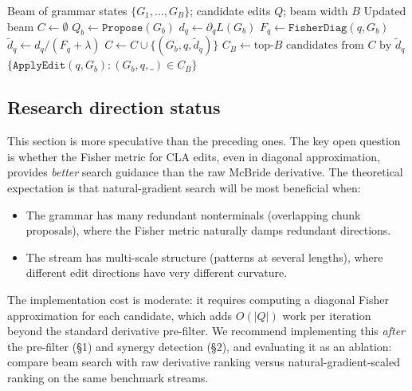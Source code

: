 \documentclass[11pt]{article}
\begin{document}
\begin{algorithm}
\caption{Geometry-aware beam search (speculative)}
\label{alg:natgrad}
\begin{algorithmic}[1]
\Require Beam of grammar states $\{G_1, \ldots, G_B\}$; candidate edits $Q$; beam width $B$
\Ensure Updated beam
\State $C \gets \emptyset$ 
  \State $Q_b \gets \texttt{Propose}(G_b)$ 
    \State $d_q \gets \partial_q L(G_b)$ 
    \State $F_q \gets \texttt{FisherDiag}(q, G_b)$ 
    \State $\tilde{d}_q \gets d_q / (F_q + \lambda)$ 
    \State $C \gets C \cup \{(G_b, q, \tilde{d}_q)\}$
  \EndFor
\EndFor
\State $C_B \gets \text{top-}B \text{ candidates from } C \text{ by } \tilde{d}_q$
\State \Return $\{\texttt{ApplyEdit}(q, G_b) : (G_b, q, \_) \in C_B\}$
\end{algorithmic}
\end{algorithm}

\subsection{Research direction status}

This section is more speculative than the preceding ones.  The key open question is whether the Fisher metric for CLA edits, even in diagonal approximation, provides \emph{better} search guidance than the raw McBride derivative.  The theoretical expectation is that natural-gradient search will be most beneficial when:
\begin{itemize}
  \item The grammar has many redundant nonterminals (overlapping chunk proposals), where the Fisher metric naturally damps redundant directions.
  \item The stream has multi-scale structure (patterns at several lengths), where different edit directions have very different curvature.
\end{itemize}

The implementation cost is moderate: it requires computing a diagonal Fisher approximation for each candidate, which adds $O(|Q|)$ work per iteration beyond the standard derivative pre-filter.  We recommend implementing this \emph{after} the pre-filter (\S1) and synergy detection (\S2), and evaluating it as an ablation: compare beam search with raw derivative ranking versus natural-gradient-scaled ranking on the same benchmark streams.
\end{document}
